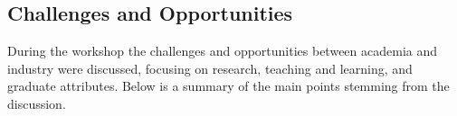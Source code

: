 
\subsection{Challenges and Opportunities}
During the workshop the challenges and opportunities between academia and industry were discussed, focusing on research, teaching and learning, and graduate attributes. Below is a summary of the main points stemming from the discussion.



